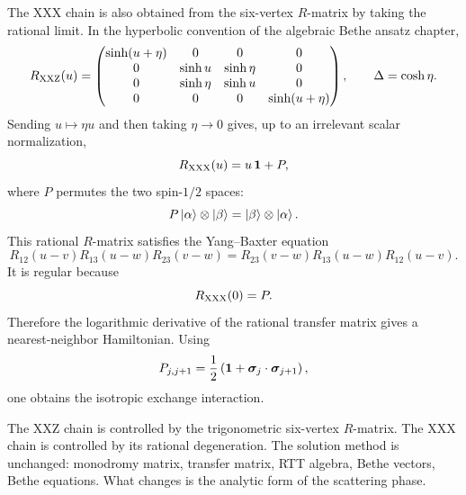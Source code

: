 The XXX chain is also obtained from the six-vertex $R$-matrix by taking the
rational limit.  In the hyperbolic convention of the algebraic Bethe ansatz
chapter,
\begin{equation}
    R_{\rm XXZ}(u)
    =
    \begin{pmatrix}
        \sinh(u+\eta)&0&0&0\\
        0&\sinh u&\sinh\eta&0\\
        0&\sinh\eta&\sinh u&0\\
        0&0&0&\sinh(u+\eta)
    \end{pmatrix},
    \qquad
    \Delta=\cosh\eta .
\end{equation}
Sending $u\mapsto\eta u$ and then taking $\eta\to0$ gives, up to an irrelevant
scalar normalization,
\begin{equation}
\label{eq:further-rational-R-matrix}
    R_{\rm XXX}(u)
    =u\,\mathbf{1}+P,
\end{equation}
where $P$ permutes the two spin-$1/2$ spaces:
\begin{equation}
\label{eq:further-permutation-operator}
    P\left|\alpha\right\rangle\otimes\left|\beta\right\rangle
    =
    \left|\beta\right\rangle\otimes\left|\alpha\right\rangle.
\end{equation}
This rational $R$-matrix satisfies the Yang--Baxter equation
\begin{equation}
\label{eq:further-rational-ybe}
    R_{12}(u-v)R_{13}(u-w)R_{23}(v-w)
    =
    R_{23}(v-w)R_{13}(u-w)R_{12}(u-v).
\end{equation}
It is regular because
\begin{equation}
\label{eq:further-rational-regularity}
    R_{\rm XXX}(0)=P.
\end{equation}
Therefore the logarithmic derivative of the rational transfer matrix gives a
nearest-neighbor Hamiltonian.  Using
\begin{equation}
    P_{j,j+1}=\frac12\left(\mathbf{1}+\bm{\sigma}_j\cdot\bm{\sigma}_{j+1}\right),
\end{equation}
one obtains the isotropic exchange interaction.

\begin{principle}
The XXZ chain is controlled by the trigonometric six-vertex $R$-matrix.  The
XXX chain is controlled by its rational degeneration.  The solution method is
unchanged: monodromy matrix, transfer matrix, RTT algebra, Bethe vectors, Bethe
equations.  What changes is the analytic form of the scattering phase.
\end{principle}


